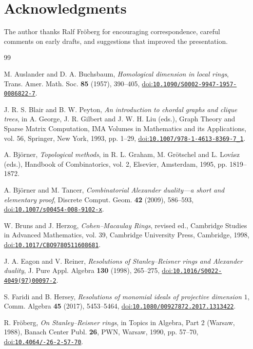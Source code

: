 \documentclass[11pt]{amsart}
\theoremstyle{definition}
\theoremstyle{remark}
\newcommand{\doi}[1]{\href{https://doi.org/#1}{doi:\nolinkurl{#1}}}
\begin{document}
	\section*{Acknowledgments}
	The author thanks Ralf Fr\"oberg for encouraging correspondence, careful comments on early drafts, and suggestions that improved the presentation.
	
	\begin{thebibliography}{99}
		
		M. Auslander and D. A. Buchsbaum, \emph{Homological dimension in local rings}, Trans. Amer. Math. Soc. \textbf{85} (1957), 390--405, \doi{10.1090/S0002-9947-1957-0086822-7}.
		
		J. R. S. Blair and B. W. Peyton, \emph{An introduction to chordal graphs and clique trees}, in A. George, J. R. Gilbert and J. W. H. Liu (eds.), Graph Theory and Sparse Matrix Computation, IMA Volumes in Mathematics and its Applications, vol. 56, Springer, New York, 1993, pp. 1--29, \doi{10.1007/978-1-4613-8369-7_1}.
		
		A. Bj\"orner, \emph{Topological methods}, in R. L. Graham, M. Gr\"otschel and L. Lov\'asz (eds.), Handbook of Combinatorics, vol. 2, Elsevier, Amsterdam, 1995, pp. 1819--1872.
		
		A. Bj\"orner and M. Tancer, \emph{Combinatorial Alexander duality---a short and elementary proof}, Discrete Comput. Geom. \textbf{42} (2009), 586--593, \doi{10.1007/s00454-008-9102-x}.
		
		W. Bruns and J. Herzog, \emph{Cohen--Macaulay Rings}, revised ed., Cambridge Studies in Advanced Mathematics, vol. 39, Cambridge University Press, Cambridge, 1998, \doi{10.1017/CBO9780511608681}.
		
		J. A. Eagon and V. Reiner, \emph{Resolutions of Stanley--Reisner rings and Alexander duality}, J. Pure Appl. Algebra \textbf{130} (1998), 265--275, \doi{10.1016/S0022-4049(97)00097-2}.
		
		S. Faridi and B. Hersey, \emph{Resolutions of monomial ideals of projective dimension $1$}, Comm. Algebra \textbf{45} (2017), 5453--5464, \doi{10.1080/00927872.2017.1313422}.
		
		R. Fr\"oberg, \emph{On Stanley--Reisner rings}, in Topics in Algebra, Part 2 (Warsaw, 1988), Banach Center Publ. \textbf{26}, PWN, Warsaw, 1990, pp. 57--70, \doi{10.4064/-26-2-57-70}.
		

\end{thebibliography}
\end{document}
